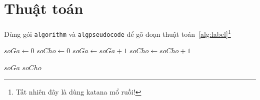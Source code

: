 \section{Thuật toán}
Dùng gói \texttt{algorithm} và \texttt{algpseudocode} để gõ đoạn thuật toán~\ref{alg:label}\footnote{Tất nhiên đây là dùng katana mổ ruồi!}

\begin{algorithm}
	\caption{Thuật toán đếm xem nhiều gà hay nhiều chó hơn}
	\label{alg:label}
	\begin{algorithmic}
		\State $soGa \gets 0$
		\State $soCho \gets 0$
		\State $soGa \gets soGa + 1$
		\EndFor
		\State $soCho \gets soCho + 1$
		\EndFor

		\State\Return $soGa$
		\State\Return $soCho$
		\Else
		\State\Return {}
		\EndIf
		\EndFunction
	\end{algorithmic}
\end{algorithm}